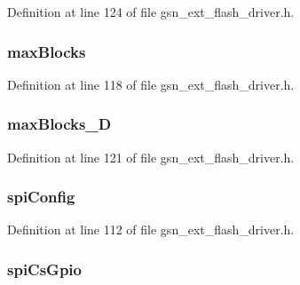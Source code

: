 Definition at line 124 of file gsn\_\-ext\_\-flash\_\-driver.h.

\hypertarget{a00071_a20186b2859c047d77a5e408d04ec65fe}{
\subsubsection[{maxBlocks}]{ {\bf maxBlocks}}}
\label{a00071_a20186b2859c047d77a5e408d04ec65fe}


Definition at line 118 of file gsn\_\-ext\_\-flash\_\-driver.h.

\hypertarget{a00071_a4956629ef12bf230be1561d560f60d01}{
\subsubsection[{maxBlocks\_\-D}]{ {\bf maxBlocks\_\-D}}}
\label{a00071_a4956629ef12bf230be1561d560f60d01}


Definition at line 121 of file gsn\_\-ext\_\-flash\_\-driver.h.

\hypertarget{a00071_aaa45f93abc04d3ee7a70c0e8f5f382f3}{
\subsubsection[{spiConfig}]{ {\bf spiConfig}}}
\label{a00071_aaa45f93abc04d3ee7a70c0e8f5f382f3}


Definition at line 112 of file gsn\_\-ext\_\-flash\_\-driver.h.

\hypertarget{a00071_af0db42ec8db8199a51522b74b520d5fe}{
\subsubsection[{spiCsGpio}]{ {\bf spiCsGpio}}}
\label{a00071_af0db42ec8db8199a51522b74b520d5fe}


